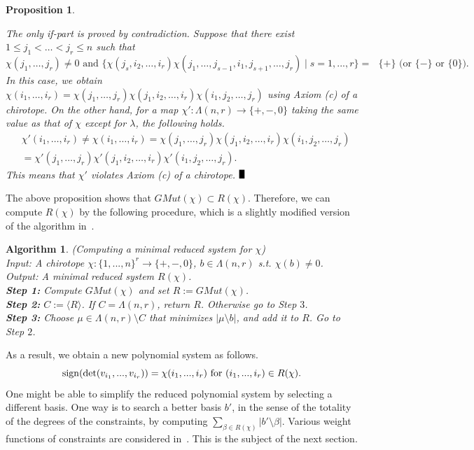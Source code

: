 \documentclass{article}
\def\BBox{\rule{2mm}{3mm}}
\def\QED{\hfill$\BBox$}
\newenvironment{proof}
{\begin{rm}\par\smallskip\noindent{\bf Proof.}\quad}{\QED\end{rm}}
\newtheorem{prop}[thm]{\bfseries Proposition} %
\newtheorem{alg}[thm]{\bfseries Algorithm}
\begin{document}
\begin{prop}
\begin{proof}
The only if-part is proved by contradiction.
Suppose that there exist $1 \leq j_1 < \dots < j_r \leq n$ such that
\[
\chi (j_{1},\dots, j_{r}) \neq 0 \text{ and }
\{ \chi (j_{s},i_{2},\dots, i_{r})\chi (j_{1},\dots, j_{s-1},i_{1},j_{s+1},\dots, j_{r}) \mid  s=1,...,r\} = \text{ $\{ + \}$ (or $\{- \}$ or $\{ 0\}$).}
\]
In this case, we obtain $\chi (i_1,\dots,i_r) = \chi(j_1,\dots,j_r) \chi (j_{1},i_{2},\dots, i_{r}) \chi (i_{1},j_{2},\dots, j_{r})$ using 
Axiom (c) of a chirotope.
On the other hand, for a map $\chi':\Lambda(n,r) \rightarrow \{ +,-,0 \}$ taking the same value as that of $\chi$ except for $\lambda$,
the following holds.
\begin{align*}
& \chi' (i_1,\dots,i_r) 
\neq
\chi (i_1,\dots,i_r) 
=\chi (j_1,\dots,j_r) \chi (j_{1},i_{2},\dots, i_{r}) \chi (i_{1},j_{2},\dots, j_{r})\\
&= \chi'(j_1,\dots,j_r) \chi' (j_{1},i_{2},\dots, i_{r}) \chi' (i_{1},j_{2},\dots, j_{r}). 
\end{align*}
This means that $\chi'$ violates Axiom (c) of a chirotope.
\end{proof}
\end{prop}


The above proposition shows that $GMut(\chi ) \subset R(\chi )$.
Therefore, we can compute $R(\chi )$ by the following procedure, which is a slightly modified version of
the algorithm in~\cite{BRS90,N07}.
\begin{alg}(Computing a minimal reduced system for $\chi$)\\
Input: A chirotope $\chi :\{ 1,...,n \}^{r} \rightarrow \{ +,-,0 \}$,  $b \in \Lambda (n,r)$ s.t. $\chi (b) \neq 0$.\\
Output: A minimal reduced system $R(\chi )$.\\
{\bf Step 1:} Compute $GMut(\chi )$ and set $R:=GMut(\chi )$.\\
{\bf Step 2:} $C:= \langle R \rangle$. If $C =\Lambda (n,r)$, return $R$. Otherwise go to Step $3$.\\
{\bf Step 3:} Choose $\mu \in \Lambda (n,r) \setminus C$ that minimizes $|\mu \setminus b|$, and add it to $R$. Go to Step $2$.
\end{alg}

As a result, we obtain a new polynomial system as follows.
\begin{equation} \label{MinReduced:eq1}
 {\rm sign}(\det(v_{i_{1}},...,v_{i_{r}})) = \chi (i_{1},...,i_{r}) \text{ for $(i_{1},...,i_{r}) \in R(\chi ).$}
\end{equation}
One might be able to simplify the reduced polynomial system 
by selecting a different basis.
One way is to search a better basis $b'$, in the sense of the totality of the degrees of the constraints,
by computing $\sum_{\beta \in R(\chi )}{|b' \setminus \beta |}$.
Various weight functions of constraints are considered in~\cite{BRS90,N07}.
This is the subject of the next section.
\end{document}
